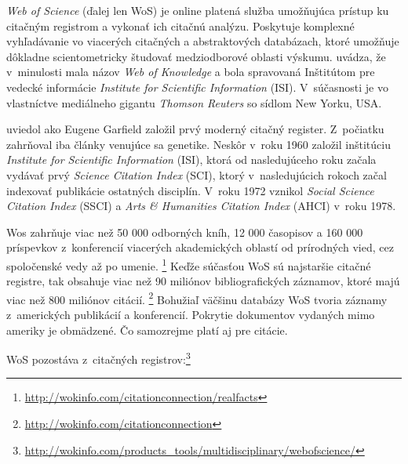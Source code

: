 \emph{Web of Science} (ďalej len WoS) je online platená služba umožňujúca prístup ku
citačným registrom a vykonať ich citačnú analýzu.  Poskytuje komplexné vyhľadávanie vo
viacerých citačných a abstraktových databázach, ktoré umožňuje dôkladne
scientometricky študovať medziodborové oblasti výskumu. \citet{Drake2005}
uvádza, že v~minulosti mala názov \emph{Web of Knowledge} a bola spravovaná
Inštitútom pre vedecké informácie \emph{Institute for Scientific Information}
(ISI).  V~súčasnosti je vo vlastníctve mediálneho gigantu \emph{Thomson Reuters}
so sídlom New Yorku, USA.

\citet{Smith2012} uviedol ako Eugene Garfield založil prvý moderný citačný
register.  Z~počiatku zahrňoval iba články venujúce sa genetike.  Neskôr v~roku
1960 založil inštitúciu \emph{Institute for Scientific Information} (ISI),
ktorá od nasledujúceho roku začala vydávať prvý  \emph{Science Citation Index} (SCI), ktorý v~nasledujúcich rokoch začal
indexovať publikácie ostatných disciplín.  V~roku 1972 vznikol  \emph{Social Science Citation Index} (SSCI) a
 \emph{Arts \& Humanities
Citation Index} (AHCI) v~roku 1978.

Wos zahrňuje viac než 50 000 odborných kníh, 12 000 časopisov a 160 000
príspevkov z~konferencií viacerých akademických oblastí od prírodných vied, cez
spoločenské vedy až po umenie.
\footnote{\url{http://wokinfo.com/citationconnection/realfacts}} Keďže súčasťou
WoS sú najstaršie citačné registre, tak obsahuje viac než 90 miliónov
bibliografických záznamov, ktoré majú viac než 800 miliónov citácií.
\footnote{\url{http://wokinfo.com/citationconnection}} Bohužiaľ väčšinu
databázy WoS tvoria záznamy z~amerických publikácií a konferencií. Pokrytie
dokumentov vydaných mimo ameriky je obmädzené.  Čo samozrejme platí aj pre
citácie.

WoS pozostáva z~citačných registrov:\footnote{\url{http://wokinfo.com/products_tools/multidisciplinary/webofscience/}}

